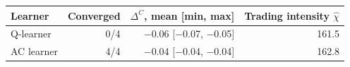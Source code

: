 \begin{tabular}{@{}lrrr@{}}
\toprule
Learner & Converged & $\Delta^C$, mean [min, max] & Trading intensity $\hat\chi$ \\
\midrule
Q-learner & 0/4 & $-$0.06 [$-$0.07, $-$0.05] & 161.5 \\
AC learner & 4/4 & $-$0.04 [$-$0.04, $-$0.04] & 162.8 \\
\bottomrule
\end{tabular}

